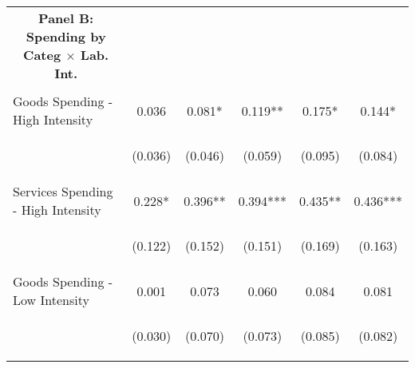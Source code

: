 \begin{tabular}{lccccc}
    \multicolumn{1}{c}{\textbf{Panel B: Spending by Categ $\times$ Lab. Int.}} \\ 
    \vspace{-2pt} & \vspace{-2pt} & \vspace{-2pt} & \vspace{-2pt} \\
    
    Goods Spending - High Intensity & 0.036 & 0.081* & 0.119** & 0.175* & 0.144* \\
    & \begin{footnotesize}(0.036)\end{footnotesize} & \begin{footnotesize}(0.046)\end{footnotesize} & \begin{footnotesize}(0.059)\end{footnotesize} & \begin{footnotesize}(0.095)\end{footnotesize} & \begin{footnotesize}(0.084)\end{footnotesize} \\
    Services Spending - High Intensity & 0.228* & 0.396** & 0.394*** & 0.435** & 0.436*** \\
    & \begin{footnotesize}(0.122)\end{footnotesize} & \begin{footnotesize}(0.152)\end{footnotesize} & \begin{footnotesize}(0.151)\end{footnotesize} & \begin{footnotesize}(0.169)\end{footnotesize} & \begin{footnotesize}(0.163)\end{footnotesize} \\
    Goods Spending - Low Intensity & 0.001 & 0.073 & 0.060 & 0.084 & 0.081 \\
    & \begin{footnotesize}(0.030)\end{footnotesize} & \begin{footnotesize}(0.070)\end{footnotesize} & \begin{footnotesize}(0.073)\end{footnotesize} & \begin{footnotesize}(0.085)\end{footnotesize} & \begin{footnotesize}(0.082)\end{footnotesize} \\

\end{tabular}
